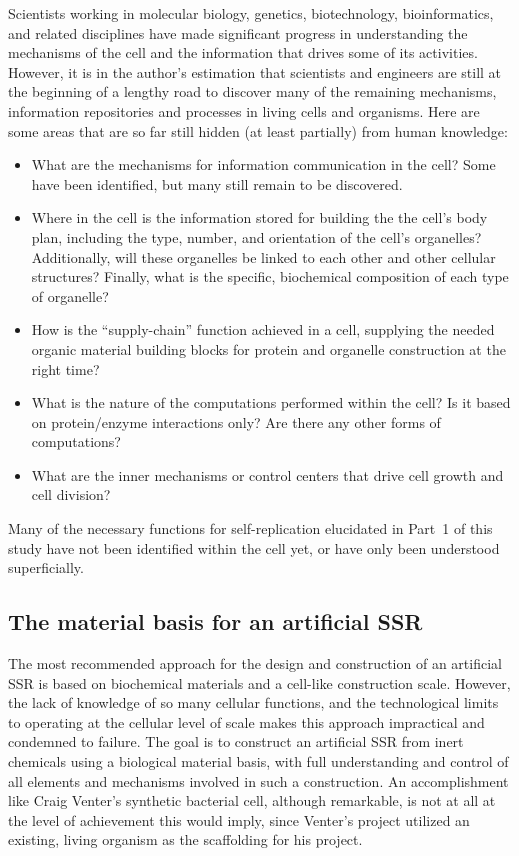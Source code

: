 Scientists working in molecular biology, genetics, biotechnology,
bioinformatics, and related disciplines have made significant progress
in understanding the mechanisms of the cell and the information that
drives some of its activities. However, it is in the author's estimation
that scientists and engineers are still
at the beginning of a lengthy road to discover many of the remaining
mechanisms, information repositories and processes in living cells and
organisms. Here are some areas that are so far still hidden (at least
partially) from human knowledge:

\begin{itemize}
\item What are the mechanisms for information communication in the cell?  Some have been identified, but many still remain to be discovered.
\item Where in the cell is the information 
stored for building the  the cell's body plan, including the type, number, and orientation of the cell's organelles?  Additionally, will these organelles be linked to each other and other cellular structures? Finally, what is the specific, biochemical composition of each type of organelle?
\item How is the “supply-chain” function achieved in a cell, supplying the needed organic material building blocks for
protein and organelle construction at the right time?
\item What is the nature of the computations performed within the cell? Is
it based on protein/enzyme interactions only? Are there any other
forms of computations?
\item What are the inner mechanisms or control centers that drive cell
growth and cell division?
\end{itemize}

Many of the necessary functions for self-replication
elucidated in Part~1 of this study have not been identified within
the cell yet, or have only been understood superficially.

\subsection{The material basis for an artificial SSR}

The most recommended approach for the design and construction of an
artificial SSR is based on biochemical materials and a
cell-like construction scale. However, the lack of knowledge of so many
cellular functions, and the technological limits to
operating at the cellular level of scale makes this approach
impractical and condemned to failure. The goal is to construct
an artificial SSR from inert chemicals
using a biological material basis, with full understanding and control
of all elements and mechanisms involved in such a construction. An
accomplishment like Craig Venter’s synthetic bacterial cell, although
remarkable, is not at all at the level of achievement this would
imply, since Venter's project utilized an existing, living organism
as the scaffolding for his project.

